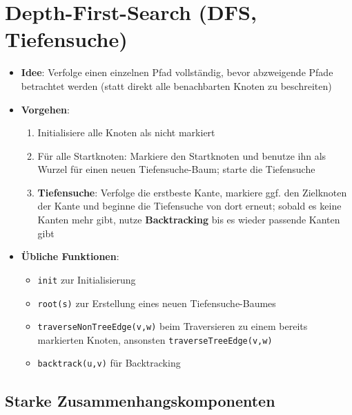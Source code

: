 \section{Depth-First-Search (DFS, Tiefensuche)}%
\label{dfs:sec:depth_first_search}

\begin{itemize}
	\item \textbf{Idee}: Verfolge einen einzelnen Pfad vollständig, bevor abzweigende Pfade betrachtet werden (statt direkt alle benachbarten Knoten zu beschreiten)
	\item \textbf{Vorgehen}:
	\begin{enumerate}
		\item Initialisiere alle Knoten als nicht markiert
		\item Für alle Startknoten: Markiere den Startknoten und benutze ihn als Wurzel für einen neuen Tiefensuche-Baum; starte die Tiefensuche
		\item \textbf{Tiefensuche}: Verfolge die erstbeste Kante, markiere ggf. den Zielknoten der Kante und beginne die Tiefensuche von dort erneut; sobald es keine Kanten mehr gibt, nutze \textbf{Backtracking} bis es wieder passende Kanten gibt
	\end{enumerate}
	\item \textbf{Übliche Funktionen}:
	\begin{itemize}
		\item \texttt{init} zur Initialisierung
		\item \texttt{root(s)} zur Erstellung eines neuen Tiefensuche-Baumes
		\item \texttt{traverseNonTreeEdge(v,w)} beim Traversieren zu einem bereits markierten Knoten, ansonsten \texttt{traverseTreeEdge(v,w)}
		\item \texttt{backtrack(u,v)} für Backtracking
	\end{itemize}
\end{itemize}

\subsection{Starke Zusammenhangskomponenten}%
\label{dfs:sub:starke_zusammenhangskomponenten}

